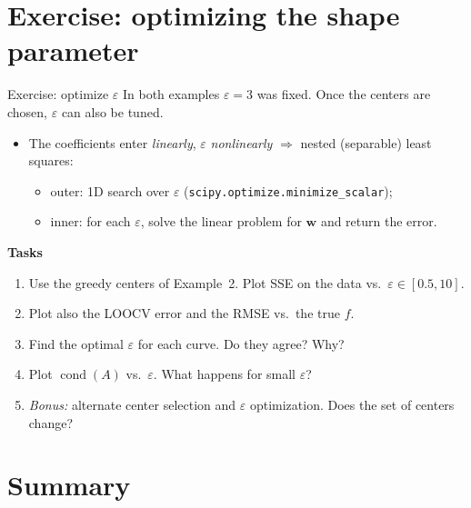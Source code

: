 \documentclass[10pt,aspectratio=169]{beamer}
\begin{document}
\section{Exercise: optimizing the shape parameter}

\begin{frame}{Exercise: optimize $\varepsilon$}
  In both examples $\varepsilon = 3$ was fixed. Once the centers are chosen,
  $\varepsilon$ can also be tuned.
  \vspace{0.3em}
  \begin{itemize}
    \item The coefficients enter \emph{linearly}, $\varepsilon$
          \emph{nonlinearly} $\Rightarrow$ nested (separable) least squares:
          \begin{itemize}
            \item outer: 1D search over $\varepsilon$
                  (\texttt{scipy.optimize.minimize\_scalar});
            \item inner: for each $\varepsilon$, solve the linear problem for
                  $\bm{w}$ and return the error.
          \end{itemize}
  \end{itemize}
  \textbf{Tasks}
  \begin{enumerate}
    \item Use the greedy centers of Example~2. Plot SSE on the data
          vs.\ $\varepsilon \in [0.5, 10]$.
    \item Plot also the LOOCV error and the RMSE vs.\ the true $f$.
    \item Find the optimal $\varepsilon$ for each curve. Do they agree? Why?
    \item Plot $\operatorname{cond}(A)$ vs.\ $\varepsilon$. What happens for
          small $\varepsilon$?
    \item \emph{Bonus:} alternate center selection and $\varepsilon$
          optimization. Does the set of centers change?
  \end{enumerate}
\end{frame}

\section{Summary}
\end{document}
